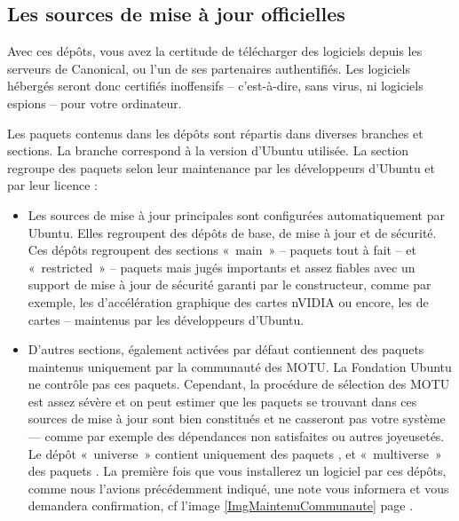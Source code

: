 {\subsection{Les sources de mise à jour officielles}
Avec ces dépôts, vous avez la certitude de télécharger des logiciels depuis les serveurs de Canonical, ou l'un de ses partenaires authentifiés. Les logiciels hébergés seront donc certifiés inoffensifs -- c'est-à-dire, sans virus, ni logiciels espions -- pour votre ordinateur.\par
Les paquets contenus dans les dépôts sont répartis dans diverses branches et sections. La branche correspond à la version d'Ubuntu utilisée. La section regroupe des paquets selon leur maintenance par les développeurs d'Ubuntu et par leur licence :\par
\begin{itemize}
\item Les sources de mise à jour principales sont configurées automatiquement par Ubuntu. Elles regroupent des dépôts de base, de mise à jour et de sécurité. Ces dépôts regroupent des sections «~main~» -- paquets tout à fait  -- et «~restricted~» -- paquets  mais jugés importants et assez fiables avec un support de mise à jour de sécurité garanti par le constructeur, comme par exemple, les  d'accélération graphique des cartes nVIDIA ou encore, les  de cartes  -- maintenus par les développeurs d'Ubuntu.
\item D'autres sections, également activées par défaut contiennent des paquets maintenus uniquement par la communauté des MOTU. La Fondation Ubuntu ne contrôle pas ces paquets. Cependant, la procédure de sélection des MOTU est assez sévère et on peut estimer que les paquets se trouvant dans ces sources de mise à jour sont bien constitués et ne casseront pas votre système --- comme par exemple des dépendances non satisfaites ou autres joyeusetés. Le dépôt «~universe~» contient uniquement des paquets , et «~multiverse~» des paquets . La première fois que vous installerez un logiciel par ces dépôts, comme nous l'avions précédemment indiqué, une note vous informera et vous demandera confirmation, cf l'image \ref{ImgMaintenuCommunaute} page \pageref{ImgMaintenuCommunaute}.

\end{itemize}}
